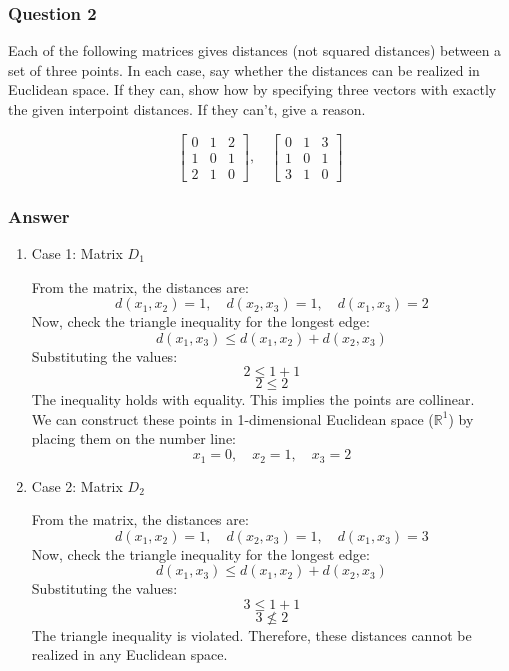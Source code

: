 \documentclass{article}
\begin{document}
\subsubsection*{Question 2}
\begin{flushleft}
    Each of the following matrices gives distances (not squared distances) between a set of three points. In each case, say whether the distances can be realized in Euclidean space. If they can, show how by specifying three vectors with exactly the given interpoint distances. If they can't, give a reason.

\[
\begin{bmatrix}
0 & 1 & 2 \\
1 & 0 & 1 \\
2 & 1 & 0
\end{bmatrix}, \quad
\begin{bmatrix}
0 & 1 & 3 \\
1 & 0 & 1 \\
3 & 1 & 0
\end{bmatrix}
\]
\end{flushleft}

\subsubsection*{Answer} 
\begin{enumerate}
    \item Case 1: Matrix $D_1$
    \begin{flushleft}
        From the matrix, the distances are:
        $$ d(x_1, x_2) = 1, \quad d(x_2, x_3) = 1, \quad d(x_1, x_3) = 2$$
        Now, check the triangle inequality for the longest edge: 
        $$d(x_1, x_3) \leq d(x_1, x_2) + d(x_2, x_3)$$
        Substituting the values:
        $$2 \leq 1 + 1$$
        $$2 \leq 2$$
        The inequality holds with equality. This implies the points are collinear.\\
        We can construct these points in 1-dimensional Euclidean space ($\mathbb{R}^1$) by placing them on the number line:
        $$ x_1 = 0, \quad x_2 = 1, \quad x_3 = 2 $$
    \end{flushleft}
    
    \item Case 2: Matrix $D_2$
    \begin{flushleft}
        From the matrix, the distances are:
        $$ d(x_1, x_2) = 1, \quad d(x_2, x_3) = 1, \quad d(x_1, x_3) = 3$$
        Now, check the triangle inequality for the longest edge: 
        $$d(x_1, x_3) \leq d(x_1, x_2) + d(x_2, x_3)$$ 
        Substituting the values:
        $$3 \leq 1 + 1$$
        $$3 \nleq 2$$
        The triangle inequality is violated. Therefore, these distances cannot be realized in any Euclidean space.
    \end{flushleft}
\end{enumerate}
\end{document}
